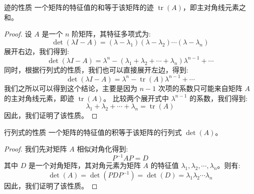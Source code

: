 \documentclass[a4paper,12pt]{ctexart}
\begin{document}
\begin{myprop}{迹的性质}{}
    一个矩阵的特征值的和等于该矩阵的迹 $\operatorname{tr}(A)$，即主对角线元素之和。
\end{myprop}
\begin{proof}
    设 $A$ 是一个 $n$ 阶矩阵，其特征多项式为:
    \[
    \det(\lambda I - A) = (\lambda - \lambda_1)(\lambda - \lambda_2) \cdots (\lambda - \lambda_n)
    \]
    展开右边，我们得到:
    \[
    \det(\lambda I - A) = \lambda^n - (\lambda_1 + \lambda_2 + \cdots + \lambda_n) \lambda^{n-1} + \cdots
    \]
    同时，根据行列式的性质，我们也可以直接展开左边，得到:
    \[
    \det(\lambda I - A) = \lambda^n - \operatorname{tr}(A) \lambda^{n-1} + \cdots
    \]
    我们之所以可以得到这个结论，主要是因为 $n-1$ 次项的系数只可能来自矩阵 $A$ 的主对角线元素，即迹 $\operatorname{tr}(A)$。
    比较两个展开式中 $\lambda^{n-1}$ 的系数，我们得到:
    \[
    \lambda_1 + \lambda_2 + \cdots + \lambda_n = \operatorname{tr}(A)
    \]
    因此，我们证明了该性质。
\end{proof}

\begin{myprop}{行列式的性质}{}
    一个矩阵的特征值的积等于该矩阵的行列式 $\det(A)$。
\end{myprop}
\begin{proof}
    我们先对矩阵 $A$ 相似对角化得到:
    \[
    P^{-1} A P = D
    \]
    其中 $D$ 是一个对角矩阵，其对角元素为矩阵 $A$ 的特征值 $\lambda_1, \lambda_2, \cdots, \lambda_n$。则有:
    \[
    \det(A) = \det(P D P^{-1}) = \det(D) = \lambda_1 \lambda_2 \cdots \lambda_n
    \]
    因此，我们证明了该性质。
\end{proof}
\end{document}
